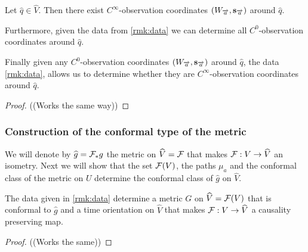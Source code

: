 \begin{proposition}\label{prop:findsmoothcoords}
Let  $\widehat{q}\in \widehat{V}$. 
Then there exist $C^\infty$-observation coordinates $(W_\aa,\mathbf{s}_\aa)$ around $\widehat{q}$.

Furthermore, given the data from \ref{rmk:data} we can determine all $C^0$-observation coordinates around $\widehat{q}$.

Finally given any $C^0$-observation coordinates $(W_\aa,\mathbf{s}_\aa)$ around $\widehat{q}$, the data \ref{rmk:data}, allows us to determine whether they are $C^\infty$-observation coordinates around $\widehat{q}$.
\end{proposition}
\begin{proof}
((Works the same way))
\end{proof}

\subsubsection{Construction of the conformal type of the metric}
We will denote by $\widehat{g}=\F_*g$ the metric on $\widehat{V}=\F$ that makes $\F:V\to \widehat{V}$ an isometry. Next we will show that the set $\F(V)$, the paths $\mu_a$ and the conformal class of the metric on $U$ determine the conformal class of $\widehat{g}$ on $\widehat{V}$.

\begin{lemma}\label{lem:constructmetric}
The data given in \ref{rmk:data} determine a metric $G$ on $\widehat{V}=\F(V)$ that is conformal to $\widehat{g}$ and a time orientation on $\widehat{V}$ that makes $\F:V\to \widehat{V}$ a causality preserving map.
\end{lemma}
\begin{proof}
((Works the same))
\end{proof}